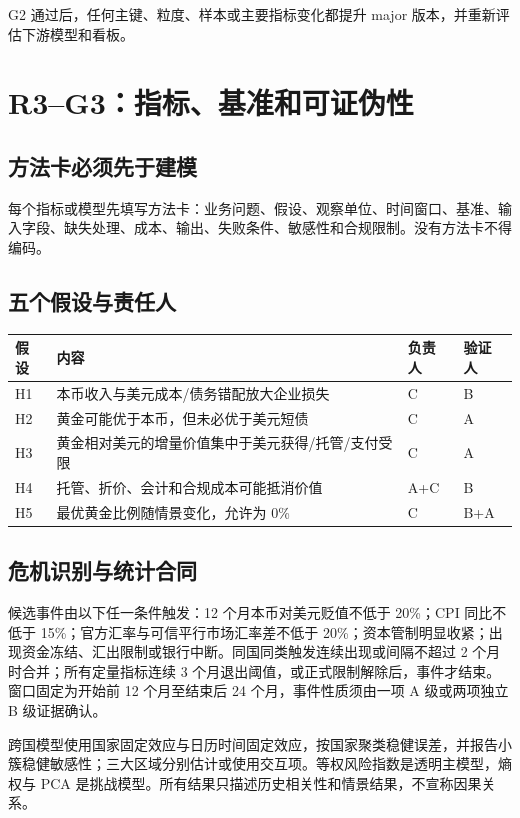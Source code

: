\documentclass[UTF8,12pt,openany]{ctexbook}
\begin{document}
G2 通过后，任何主键、粒度、样本或主要指标变化都提升 major 版本，并重新评估下游模型和看板。

\chapter{R3--G3：指标、基准和可证伪性}

\section{方法卡必须先于建模}
每个指标或模型先填写方法卡：业务问题、假设、观察单位、时间窗口、基准、输入字段、缺失处理、成本、输出、失败条件、敏感性和合规限制。没有方法卡不得编码。

\section{五个假设与责任人}
\begin{longtable}{p{1.2cm}p{7.4cm}p{2.2cm}p{2.2cm}}
\toprule
\textbf{假设} & \textbf{内容} & \textbf{负责人} & \textbf{验证人}\\
\midrule
H1 & 本币收入与美元成本/债务错配放大企业损失 & C & B\\
H2 & 黄金可能优于本币，但未必优于美元短债 & C & A\\
H3 & 黄金相对美元的增量价值集中于美元获得/托管/支付受限 & C & A\\
H4 & 托管、折价、会计和合规成本可能抵消价值 & A+C & B\\
H5 & 最优黄金比例随情景变化，允许为 0\% & C & B+A\\
\bottomrule
\end{longtable}

\section{危机识别与统计合同}
候选事件由以下任一条件触发：12 个月本币对美元贬值不低于 20\%；CPI 同比不低于 15\%；官方汇率与可信平行市场汇率差不低于 20\%；资本管制明显收紧；出现资金冻结、汇出限制或银行中断。同国同类触发连续出现或间隔不超过 2 个月时合并；所有定量指标连续 3 个月退出阈值，或正式限制解除后，事件才结束。窗口固定为开始前 12 个月至结束后 24 个月，事件性质须由一项 A 级或两项独立 B 级证据确认。

跨国模型使用国家固定效应与日历时间固定效应，按国家聚类稳健误差，并报告小簇稳健敏感性；三大区域分别估计或使用交互项。等权风险指数是透明主模型，熵权与 PCA 是挑战模型。所有结果只描述历史相关性和情景结果，不宣称因果关系。
\end{document}
